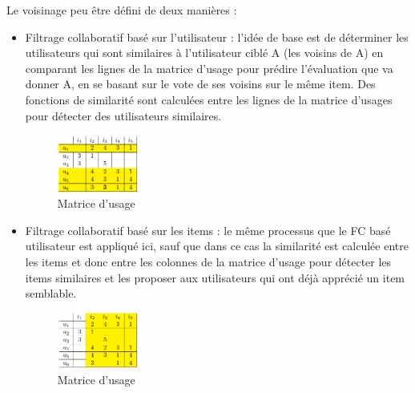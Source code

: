 \documentclass[a4paper,12pt,letterpaper,headsepline,singlespacing,headsepline, french]{report}
\begin{document}
Le voisinage peu être défini de deux manières :
\begin{itemize}
\item Filtrage collaboratif basé sur l’utilisateur : l'idée de base est de déterminer les utilisateurs qui sont similaires à l'utilisateur ciblé A (les voisins de A) en comparant les lignes de la matrice d’usage pour prédire l’évaluation que va donner A, en se basant sur le vote de ses voisins sur le même item. 
Des fonctions de similarité sont calculées entre les lignes de la matrice d’usages pour détecter des utilisateurs similaires.	
\begin{figure}[H]
	\centering
	\includegraphics[width=0.25\textwidth]{mat_user_user.png}
	\caption{Matrice d’usage}
\end{figure}
		
	

\item Filtrage collaboratif basé sur les items : le même processus que le FC basé utilisateur est appliqué ici, sauf que dans ce cas la similarité est calculée entre les items et donc entre les colonnes de la matrice d’usage pour détecter les items similaires et les proposer aux utilisateurs qui ont déjà apprécié un item semblable.
\begin{figure}[H]
	\centering
\includegraphics[width=0.25\textwidth]{mat_item_item.png}
	\caption{Matrice d’usage}
\end{figure}


\end{itemize}
\end{document}

